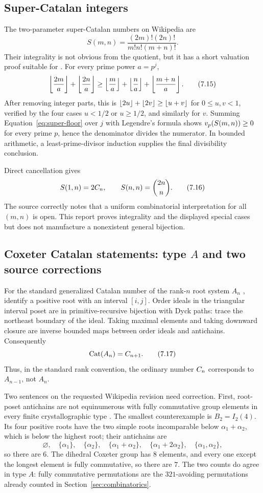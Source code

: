 \subsection{Super-Catalan integers}

The two-parameter super-Catalan numbers on Wikipedia are
\[
 S(m,n)=\frac{(2m)!(2n)!}{m!n!(m+n)!}.                           \tag{7.14}\label{eq:supercat}
\]
Their integrality is not obvious from the quotient, but it has a short
valuation proof suitable for \ipra.  For every prime power $a=p^j$,
\[
 \left\lfloor \frac{2m}{a}\right\rfloor+\left\lfloor \frac{2n}{a}\right\rfloor
 \ge
 \left\lfloor \frac m a\right\rfloor+\left\lfloor \frac n a\right\rfloor+\left\lfloor \frac{m+n}{a}\right\rfloor.     \tag{7.15}\label{eq:super-floor}
\]
After removing integer parts, this is
$\left\lfloor 2u\right\rfloor+\left\lfloor 2v\right\rfloor\ge\left\lfloor u+v\right\rfloor$ for $0\le u,v<1$, verified by
the four cases $u<1/2$ or $u\ge1/2$, and similarly for $v$.  Summing
Equation~\eqref{eq:super-floor} over $j$ with Legendre's formula shows
$v_{p}(S(m,n))\ge0$ for every prime $p$, hence the denominator divides the
numerator.  In bounded arithmetic, a least-prime-divisor induction supplies
the final divisibility conclusion.

Direct cancellation gives
\[
 S(1,n)=2C_n,
 \qquad
 S(n,n)=\binom{2n}{n}.                                           \tag{7.16}
\]
The source correctly notes that a uniform combinatorial interpretation for
all $(m,n)$ is open.  This report proves integrality and the displayed special
cases but does not manufacture a nonexistent general bijection.

\subsection{Coxeter Catalan statements: type \(A\) and two source corrections}

For the standard generalized Catalan number of the rank-$n$ root system
$A_n$ \cite{FominReading}, identify a positive root with an interval $[i,j]$.  Order ideals in the
triangular interval poset are in primitive-recursive bijection with Dyck paths:
trace the northeast boundary of the ideal.  Taking maximal elements and taking
downward closure are inverse bounded maps between order ideals and antichains.
Consequently
\[
              \operatorname{Cat}(A_n)=C_{n+1}.               \tag{7.17}
\]
Thus, in the standard rank convention, the ordinary number $C_n$
corresponds to $A_{n-1}$, not $A_n$.

Two sentences on the requested Wikipedia revision need correction.
First, root-poset antichains are not equinumerous with fully commutative group
elements in every finite crystallographic type \cite{StembridgeFC}.  The smallest counterexample
is $B_2=I_2(4)$.  Its four positive roots have the two simple roots incomparable below $\alpha_1+\alpha_2$, which is below the highest root; their antichains are
\[
 \varnothing,\quad \{\alpha_1\},\quad \{\alpha_2\},\quad
 \{\alpha_1+\alpha_2\},\quad \{\alpha_1+2\alpha_2\},\quad
 \{\alpha_1,\alpha_2\},
\]
so there are $6$.  The dihedral Coxeter group has $8$ elements, and every
one except the longest element is fully commutative, so there are $7$.
The two counts do agree in type $A$: fully commutative permutations are the
$321$-avoiding permutations already counted in Section~\ref{sec:combinatorics}.

